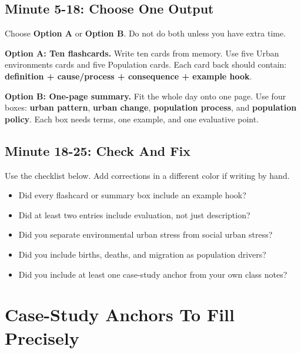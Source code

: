 \documentclass[11pt,a4paper]{article}
\newcommand{\term}[1]{\textcolor{HeadingBlue}{\textbf{#1}}}
\begin{document}
\subsection{Minute 5-18: Choose One Output}

Choose \term{Option A} or \term{Option B}. Do not do both unless you have extra
time.

\noindent\colorbox{SoftTint}{%
  \begin{minipage}{0.965\textwidth}
  \sffamily
  \textbf{\textcolor{HeadingBlue}{Option A: Ten flashcards.}}
  Write ten cards from memory. Use five Urban environments cards and five
  Population cards. Each card back should contain:
  \textbf{definition + cause/process + consequence + example hook}.
  \end{minipage}
}

\vspace{0.5em}

\noindent\colorbox{SoftBlue}{%
  \begin{minipage}{0.965\textwidth}
  \sffamily
  \textbf{\textcolor{HeadingBlue}{Option B: One-page summary.}}
  Fit the whole day onto one page. Use four boxes:
  \textbf{urban pattern}, \textbf{urban change}, \textbf{population process},
  and \textbf{population policy}. Each box needs terms, one example, and one
  evaluative point.
  \end{minipage}
}

\subsection{Minute 18-25: Check And Fix}

Use the checklist below. Add corrections in a different color if writing by
hand.

\begin{itemize}
  \item Did every flashcard or summary box include an example hook?
  \item Did at least two entries include evaluation, not just description?
  \item Did you separate environmental urban stress from social urban stress?
  \item Did you include births, deaths, and migration as population drivers?
  \item Did you include at least one case-study anchor from your own class notes?
\end{itemize}

\section{Case-Study Anchors To Fill Precisely}
\end{document}

